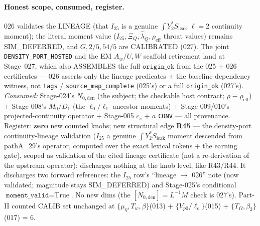 \paragraph{Honest scope, consumed, register.}
026 validates the LINEAGE (that \(I_{25}\) is a genuine \(\int Y_2^{*}S_{\mathrm{leak}}\) \(\ell=2\) continuity
moment); the literal moment value (\(I_{25},\Xi_Q,\hat\lambda_Q,\rho_{\mathrm{eff}}\) throat values) remains
SIM\_DEFERRED, and \(G,2/5,54/5\) are CALIBRATED (027). The joint \texttt{DENSITY\_PORT\_HOSTED} and the EM
\(A_w/U,W\) scaffold retirement land at Stage~027, which also ASSEMBLES the full \(\texttt{origin\_ok}\) from
the 025 + 026 certificates --- 026 asserts only the lineage predicates + the baseline dependency witness, not
\texttt{tags} / \texttt{source\_map\_complete} (025's) or a full \texttt{origin\_ok} (027's). \emph{Consumed:}
Stage-024's \(N_{0,\mathrm{den}}\) (the subject; the checkable host contract; \(\rho\equiv\rho_{\mathrm{eff}}\))
+ Stage-008's \(M_0/D_1\) (the \(\ell_0/\ell_1\) ancestor moments) + Stage-009/010's projected-continuity
operator + Stage-005 \(c_s\) + \(a\) \texttt{CONV} --- all provenance. Register: \textbf{zero} new counted
knobs; new structural edge \textbf{R45} --- the density-port continuity-lineage validation (\(I_{25}\) a
genuine \(\int Y_2^{*}S_{\mathrm{leak}}\) moment descended from pathA\_29's operator, computed over the exact
lexical tokens + the earning gate), scoped as validation of the cited lineage certificate (not a re-derivation
of the upstream operator); discharges nothing at the knob level, like R43/R44. It discharges two forward
references: the \(I_{25}\) row's ``lineage \(\to\) 026'' note (now validated; magnitude stays SIM\_DEFERRED)
and Stage-025's conditional \(\texttt{moment\_valid}=\text{True}\). No new dims (the \([N_{0,\mathrm{den}}]=L^{-1}M\)
check is 027's). Part-II counted CALIB set unchanged at \(\{\mu_\eta,T_w,\beta\}\)(013) + \(\{V_{p0}/\ell_c\}\)(015)
+ \(\{T_\Omega,\beta_2\}\)(017) = 6.

